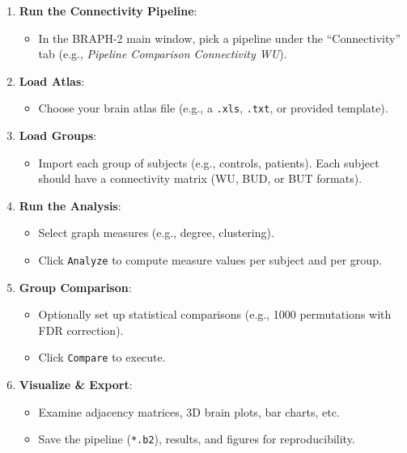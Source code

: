 \documentclass[justified]{tufte-handout}
\begin{document}
\begin{enumerate}

\item \textbf{Run the Connectivity Pipeline}:
\begin{itemize}
\item In the BRAPH-2 main window, pick a pipeline under the ``Connectivity'' tab (e.g., \textit{Pipeline Comparison Connectivity WU}).
\end{itemize}

\item \textbf{Load Atlas}:
\begin{itemize}
\item Choose your brain atlas file (e.g., a \texttt{.xls}, \texttt{.txt}, or provided template).
\end{itemize}

\item \textbf{Load Groups}:
\begin{itemize}
\item Import each group of subjects (e.g., controls, patients). Each subject should have a connectivity matrix (WU, BUD, or BUT formats).
\end{itemize}

\item \textbf{Run the Analysis}:
\begin{itemize}
\item Select graph measures (e.g., degree, clustering).
\item Click \texttt{Analyze} to compute measure values per subject and per group.
\end{itemize}

\item \textbf{Group Comparison}:
\begin{itemize}
\item Optionally set up statistical comparisons (e.g., 1000 permutations with FDR correction).
\item Click \texttt{Compare} to execute.
\end{itemize}

\item \textbf{Visualize \& Export}:
\begin{itemize}
\item Examine adjacency matrices, 3D brain plots, bar charts, etc.
\item Save the pipeline (\texttt{*.b2}), results, and figures for reproducibility.
\end{itemize}

\end{enumerate}
\end{document}
